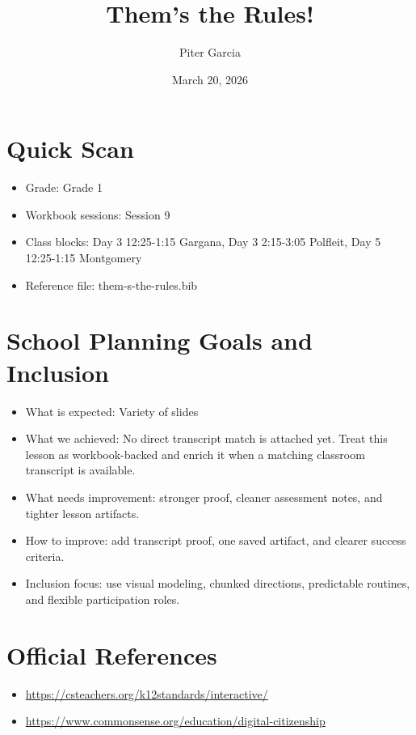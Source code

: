 \documentclass[11pt]{article}
\title{Them's the Rules!}
\author{Piter Garcia}
\date{March 20, 2026}
\begin{document}
    \maketitle
    \section*{Quick Scan}
    \begin{itemize}[leftmargin=*]
    \item Grade: Grade 1
    \item Workbook sessions: Session 9
    \item Class blocks: Day 3 12:25-1:15 Gargana, Day 3 2:15-3:05 Polfleit, Day 5 12:25-1:15 Montgomery
    \item Reference file: them-s-the-rules.bib
    \end{itemize}
    \section*{School Planning Goals and Inclusion}
    \begin{itemize}[leftmargin=*]
    \item What is expected: Variety of slides
    \item What we achieved: No direct transcript match is attached yet. Treat this lesson as workbook-backed and enrich it when a matching classroom transcript is available.
    \item What needs improvement: stronger proof, cleaner assessment notes, and tighter lesson artifacts.
    \item How to improve: add transcript proof, one saved artifact, and clearer success criteria.
    \item Inclusion focus: use visual modeling, chunked directions, predictable routines, and flexible participation roles.
    \end{itemize}
    \section*{Official References}
    \begin{itemize}[leftmargin=*]
    \item \url{https://csteachers.org/k12standards/interactive/}
\item \url{https://www.commonsense.org/education/digital-citizenship}

    \end{itemize}
    
\end{document}
